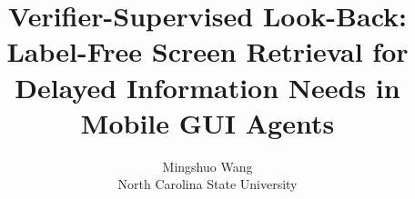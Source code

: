 \documentclass{article}
\title{Verifier-Supervised Look-Back: Label-Free Screen Retrieval for\\Delayed Information Needs in Mobile GUI Agents}
\author{Mingshuo Wang\\North Carolina State University}
\begin{document}
\maketitle
\begin{abstract}

\end{abstract}






{\small}
\end{document}
